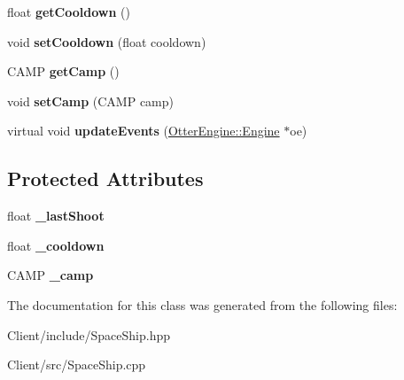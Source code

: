 \begin{DoxyCompactItemize}
\item 
float {\bfseries get\+Cooldown} ()\hypertarget{class_space_ship_a967819021b46d7494e9c12588eb32e52}{}\label{class_space_ship_a967819021b46d7494e9c12588eb32e52}

\item 
void {\bfseries set\+Cooldown} (float cooldown)\hypertarget{class_space_ship_a97a4e2985407f7d996a38e316eb7704b}{}\label{class_space_ship_a97a4e2985407f7d996a38e316eb7704b}

\item 
C\+A\+MP {\bfseries get\+Camp} ()\hypertarget{class_space_ship_a5317db59918565015cffb67420ec5f03}{}\label{class_space_ship_a5317db59918565015cffb67420ec5f03}

\item 
void {\bfseries set\+Camp} (C\+A\+MP camp)\hypertarget{class_space_ship_ad21697ffd5d06b836bbbb9e14234a584}{}\label{class_space_ship_ad21697ffd5d06b836bbbb9e14234a584}

\item 
virtual void {\bfseries update\+Events} (\hyperlink{class_otter_engine_1_1_engine}{Otter\+Engine\+::\+Engine} $\ast$oe)\hypertarget{class_space_ship_abc9941864fee6d40585517b8c00e8c4a}{}\label{class_space_ship_abc9941864fee6d40585517b8c00e8c4a}

\end{DoxyCompactItemize}
\subsection*{Protected Attributes}
\begin{DoxyCompactItemize}
\item 
float {\bfseries \+\_\+last\+Shoot}\hypertarget{class_space_ship_a4c56895ffaf54f8600d7d076f2222451}{}\label{class_space_ship_a4c56895ffaf54f8600d7d076f2222451}

\item 
float {\bfseries \+\_\+cooldown}\hypertarget{class_space_ship_af0b95e5600987a4521daa401fb1c6dcf}{}\label{class_space_ship_af0b95e5600987a4521daa401fb1c6dcf}

\item 
C\+A\+MP {\bfseries \+\_\+camp}\hypertarget{class_space_ship_a1b6d9b6e7b6af7da8cdc8ab186c33afe}{}\label{class_space_ship_a1b6d9b6e7b6af7da8cdc8ab186c33afe}

\end{DoxyCompactItemize}


The documentation for this class was generated from the following files\+:\begin{DoxyCompactItemize}
\item 
Client/include/Space\+Ship.\+hpp\item 
Client/src/Space\+Ship.\+cpp\end{DoxyCompactItemize}
